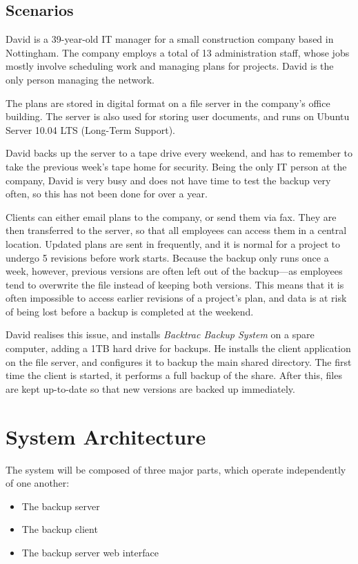\subsection{Scenarios}

David is a 39-year-old IT manager for a small construction company based in
Nottingham. The company employs a total of 13 administration staff, whose jobs
mostly involve scheduling work and managing plans for projects. David is the
only person managing the network.

The plans are stored in digital format on a file server in the company's office
building. The server is also used for storing user documents, and runs on
Ubuntu Server 10.04 LTS (Long-Term Support).

David backs up the server to a tape drive every weekend, and has to remember to
take the previous week's tape home for security. Being the only IT person at
the company, David is very busy and does not have time to test the backup very
often, so this has not been done for over a year.

Clients can either email plans to the company, or send them via fax. They are
then transferred to the server, so that all employees can access them in
a central location. Updated plans are sent in frequently, and it is normal for
a project to undergo 5 revisions before work starts. Because the backup only
runs once a week, however, previous versions are often left out of the
backup---as employees tend to overwrite the file instead of keeping both
versions. This means that it is often impossible to access earlier revisions of
a project's plan, and data is at risk of being lost before a backup is
completed at the weekend.

David realises this issue, and installs \emph{Backtrac Backup System} on
a spare computer, adding a 1TB hard drive for backups. He installs the client
application on the file server, and configures it to backup the main shared
directory. The first time the client is started, it performs a full backup of
the share. After this, files are kept up-to-date so that new versions are
backed up immediately.

\section{System Architecture}

The system will be composed of three major parts, which operate independently
of one another:

\begin{itemize}
    \item The backup server
    \item The backup client
    \item The backup server web interface
\end{itemize}

